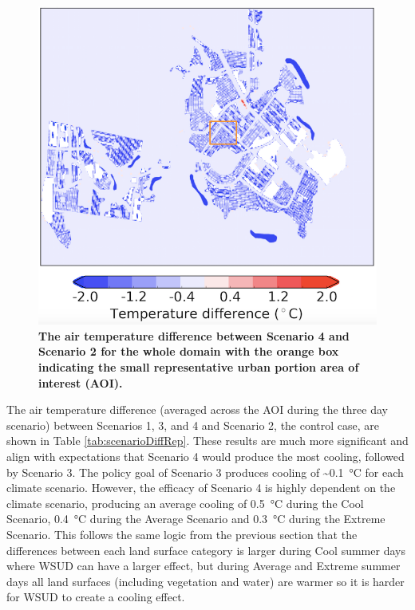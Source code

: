 \documentclass[final,3p,times,authoryear]{elsarticle}
\begin{document}
\begin{figure}[!htbp]
\centering   
\includegraphics[scale=0.40]{images/fig2}
\caption{\bf The air temperature difference between Scenario 4 and Scenario 2 for the whole domain with the orange box indicating the small representative urban portion area of interest (AOI).}    
 \label{fig:temp_diff_repre} 
\end{figure}

The air temperature difference (averaged across the AOI during the three day scenario) between Scenarios 1, 3, and 4 and Scenario 2, the control case, are shown in Table \ref{tab:scenarioDiffRep}. These results are much more significant and align with expectations that Scenario 4 would produce the most cooling, followed by Scenario 3. The policy goal of Scenario 3 produces cooling of \textasciitilde 0.1\SI{}{\degreeCelsius} for each climate scenario. However, the efficacy of Scenario 4 is highly dependent on the climate scenario, producing an average cooling of 0.5\SI{}{\degreeCelsius} during the Cool Scenario, 0.4\SI{}{\degreeCelsius} during the Average Scenario and 0.3\SI{}{\degreeCelsius} during the Extreme Scenario. This follows the same logic from the previous section that the differences between each land surface category is larger during Cool summer days where WSUD can have a larger effect, but during Average and Extreme summer days all land surfaces (including vegetation and water) are warmer so it is harder for WSUD to create a cooling effect.
\end{document}
